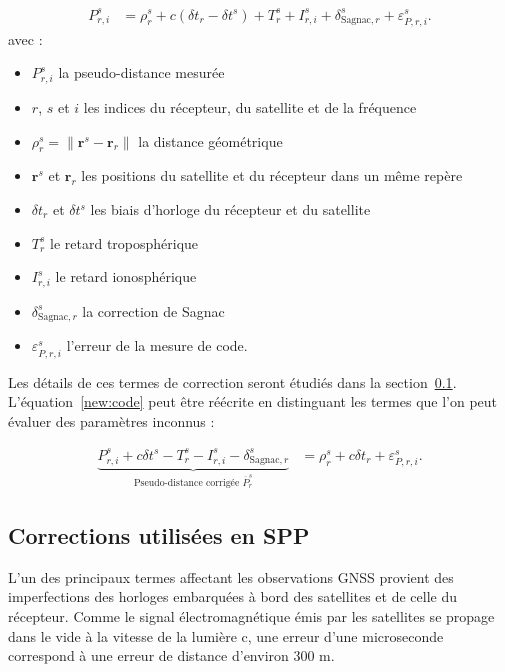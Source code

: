 \begin{align}
P_{r,i}^s &=
\rho_r^s+c(\delta t_r-\delta t^s)+T_r^s+I_{r,i}^s
+\delta_{\mathrm{Sagnac},r}^s
+\varepsilon_{P,r,i}^s.
\label{new:code}
\end{align}
avec :
\begin{itemize}
    \item $P_{r,i}^s$ la pseudo-distance mesurée 
    \item $r$, $s$ et $i$ les indices du récepteur, du satellite et de la
    fréquence 
    \item $\rho_r^s=\|\mathbf r^s-\mathbf r_r\|$ la distance géométrique 
    \item $\mathbf r^s$ et $\mathbf r_r$ les positions du satellite et du
    récepteur dans un même repère 
    \item $\delta t_r$ et $\delta t^s$ les biais d'horloge du récepteur et du
    satellite 
    \item $T_r^s$ le retard troposphérique 
    \item $I_{r,i}^s$ le retard ionosphérique 
    \item $\delta_{\mathrm{Sagnac},r}^s$ la correction de Sagnac 
    \item $\varepsilon_{P,r,i}^s$ l'erreur de la mesure de code.
\end{itemize}

Les détails de ces termes de correction seront étudiés dans la
section~\ref{new:corrections}. L'équation~\eqref{new:code} peut être réécrite en
distinguant les termes que l'on peut évaluer des paramètres inconnus :

\begin{align}
\underbrace{
P_{r,i}^s
+c\delta t^s
-T_r^s
-I_{r,i}^s
-\delta_{\mathrm{Sagnac},r}^s
}_{\text{Pseudo-distance corrigée }\overline P_r^s}
&=
\rho_r^s+c\delta t_r+\varepsilon_{P,r,i}^s.
\label{eq:termes_eval}
\end{align}

\subsection{Corrections utilisées en SPP}
\label{new:corrections}

L'un des principaux termes affectant les observations GNSS provient des imperfections des horloges embarquées à bord des satellites et de celle du récepteur. 
Comme le signal électromagnétique émis par les satellites se propage dans le vide à la vitesse de la
lumière c, une erreur d'une microseconde correspond à une erreur de distance d'environ 300 m.   

